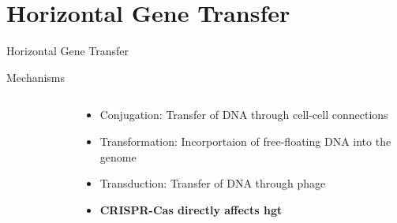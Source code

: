 \documentclass[dvipsnames]{beamer}
\begin{document}
\section{Horizontal Gene Transfer}
\begin{frame}{}
    \begin{center}
        \Huge \textcolor{OliveGreen}{Horizontal Gene Transfer}
    \end{center}
    \addtocounter{framenumber}{-1}
\end{frame}
\begin{frame}[fragile]{Mechanisms}
    \begin{columns}
    \begin{column}{0.5\textwidth}
        \begin{figure}[htb!]
            \autocite{trendslgt}
        \end{figure}
    \end{column}
    \begin{column}{0.5\textwidth}
        \begin{itemize}
            \item<2-> Conjugation: Transfer of DNA through cell-cell connections\autocite{trendslgt}
            \item<3-> Transformation: Incorportaion of free-floating DNA into the genome\autocite{trendslgt}
            \item<4-> Transduction: Transfer of DNA through phage\autocite{trendslgt}
            \item<5-> \textbf{CRISPR-Cas directly affects \ac{hgt}}\autocite{trendslgt}
        \end{itemize}
    \end{column}
    \end{columns}
\end{frame}
\end{document}
